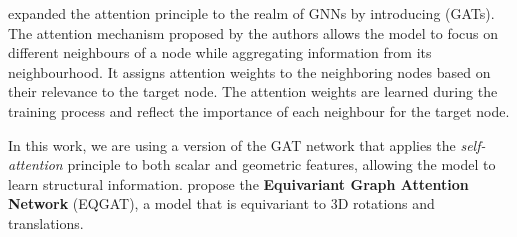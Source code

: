 \citet{gat} expanded the attention principle to the realm of GNNs by introducing  (GATs). The attention mechanism proposed by the authors allows the model to focus on different neighbours of a node while aggregating information from its neighbourhood. It assigns attention weights to the neighboring nodes based on their relevance to the target node. The attention weights are learned during the training process and reflect the importance of each neighbour for the target node.

In this work, we are using a version of the GAT network that applies the \textit{self-attention} principle to both scalar and geometric features, allowing the model to learn structural information. \citet{eqgat} propose the \textbf{Equivariant Graph Attention Network} (EQGAT), a model that is equivariant to 3D rotations and translations.


